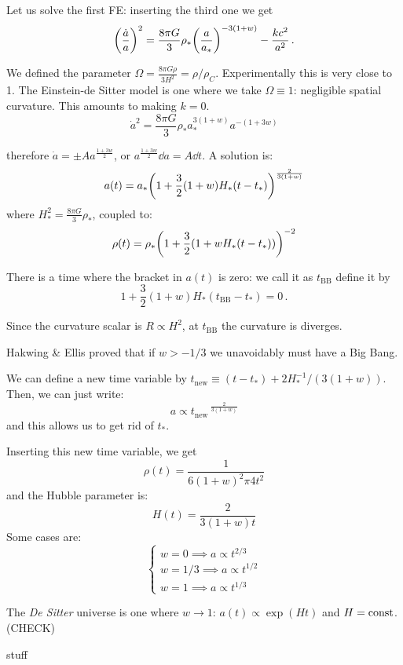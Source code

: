 \documentclass[main.tex]{subfiles}
\begin{document}
Let us solve the first FE: inserting the third one we get
\begin{equation}
  \qty(\frac{\dot{a} }{a})^2 = 
  \frac{8 \pi G}{3} \rho_* \qty(\frac{a}{a_*}) ^{-3 (1+w)} - \frac{kc^2}{a^2}\,.
\end{equation}

We defined the parameter \(\Omega = \frac{8 \pi G \rho}{3 H^2} = \rho / \rho_C\).
Experimentally this is very close to 1.
The Einstein-de Sitter model is one where we take \(\Omega \equiv 1\): negligible spatial curvature. This amounts to making \(k=0\).
\begin{equation}
  \dot{a}^2 = \frac{8 \pi G}{3} \rho_* a_{*}^{3 (1+w)} a^{-(1+3w)}
\end{equation}

therefore \(\dot{a} = \pm A a^{\frac{1+3w}{2}}\), or \(a ^{\frac{1+3w}{2}}\dd{a} = A \dd{t}\). A solution is:
\begin{equation}
  a(t)= a_{*} \qty(
    1 + \frac{3}{2} (1+w) H_{*} (t - t_{*})
  )^{\frac{2}{3(1+w)}}
\end{equation}
where \(H_{*}^2 = \frac{8 \pi G}{3} \rho_{*}\), coupled to:
\begin{equation}
  \rho(t) = \rho_{*} \qty(1 + \frac{3}{2}(1+w H_* (t-t_*)))^{-2}
\end{equation}

There is a time where the bracket in \(a(t)\) is zero: we call it as \(t_{\text{BB}}\) define it by
\begin{equation}
  1 + \frac{3}{2} (1+w) H_{*} (t_{\text{BB}} - t_* ) = 0\,.
\end{equation}

Since the curvature scalar is \(R \propto H^2\), at \(t_{\text{BB}}\)  the curvature is diverges.

Hakwing \& Ellis proved that if \(w>-1/3\) we unavoidably must have a Big Bang.

We can define a new time variable by \(t_{\text{new}} \equiv (t - t_{*}) + 2 H_*^{-1} / (3 (1+w))\). Then, we can just write:
\begin{equation}
  a \propto t_{\text{new}}\,^{\frac{2}{3(1+w)}}
\end{equation}
and this allows us to get rid of \(t_{*}\).

Inserting this new time variable, we get
\begin{equation}
  \rho(t) = \frac{1}{6 (1+w)^2 \pi 4 t^2}
\end{equation}
and the Hubble parameter is:
\begin{equation}
  H(t) = \frac{2}{3(1+w) t}
\end{equation}
Some cases are:
\begin{equation}
  \begin{cases}
      w = 0 \implies a \propto t^{2/3}  \\
      w=1/3 \implies a \propto t^{1/2} \\  
      w=1 \implies a \propto t^{1/3}  
  \end{cases}
\end{equation}

The \emph{De Sitter} universe is one where \(w \rightarrow 1\): \(a(t) \propto \exp(Ht) \) and \(H = \text{const}\). (CHECK) 

stuff
\end{document}
